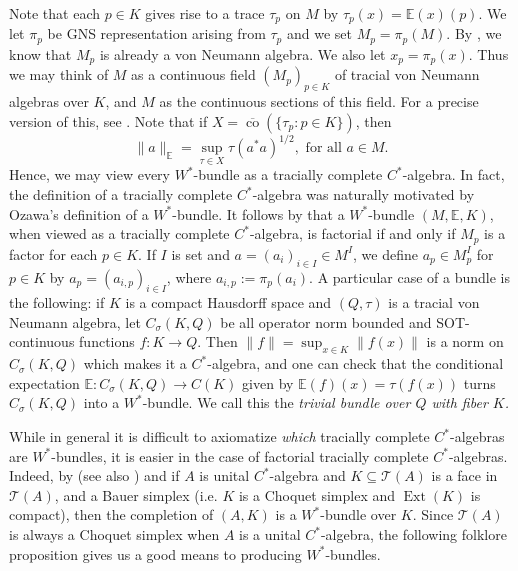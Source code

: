 \documentclass[10pt]{amsart}
\theoremstyle{definition}
\numberwithin{equation}{section}
\newcommand{\bE}{{\mathbb E}}
\newcommand{\cT}{{\mathcal T}}
\DeclareMathOperator{\Ext}{Ext}
\DeclareMathOperator{\co}{co}
\begin{document}
Note that each $p\in K$ gives rise to a trace $\tau_{p}$ on $M$ by $\tau_{p}(x)=\bE(x)(p)$. We let $\pi_{p}$ be GNS representation arising from $\tau_{p}$ and we set $M_{p}=\pi_{p}(M)$. By \cite[Theorem 11]{OzawaBundle}, we know that $M_{p}$ is already a von Neumann algebra. We also let $x_{p}=\pi_{p}(x)$. Thus we may think of $M$ as a continuous field $(M_{p})_{p\in K}$ of tracial von Neumann algebras over $K$, and $M$ as the continuous sections of this field. For a precise version of this, see \cite{EPBundles}.
Note that if $X=\overline{\co}(\{\tau_{p}:p\in K\})$, then 
\[\|a\|_{\bE}=\sup_{\tau\in X}\tau(a^{*}a)^{1/2}, \text{ for all $a\in M$.}\]
Hence, we may view every $W^{*}$-bundle as a tracially complete $C^{*}$-algebra. In fact, the definition of a tracially complete $C^{*}$-algebra was naturally motivated by Ozawa's definition of a $W^{*}$-bundle. 
It follows by \cite[Proposition 3.6]{TraciallyComplete} that a $W^{*}$-bundle $(M,\bE,K)$, when viewed as a tracially complete $C^{*}$-algebra, is factorial if and only if $M_{p}$ is a factor for each $p\in K$. If $I$ is set and $a=(a_{i})_{i\in I}\in M^{I}$, we define $a_{p}\in M_{p}^{I}$ for $p\in K$ by $a_{p}=(a_{i,p})_{i\in I}$, where $a_{i,p}:=\pi_{p}(a_{i})$.
A particular case of a bundle is the following: if $K$ is a compact Hausdorff space and $(Q,\tau)$ is a tracial von Neumann algebra, let $C_{\sigma}(K,Q)$ be all operator norm bounded and SOT-continuous functions $f\colon K\to Q$. 
Then $\|f\|=\sup_{x\in K}\|f(x)\|$ is a norm on $C_{\sigma}(K,Q)$ which makes it a $C^{*}$-algebra, and one can check that the conditional expectation $\bE\colon C_{\sigma}(K,Q)\to C(K)$ given by $\bE(f)(x)=\tau(f(x))$ turns $C_{\sigma}(K,Q)$ into a $W^{*}$-bundle. We call this the \emph{trivial bundle over $Q$ with fiber $K$.}


While in general it is difficult to axiomatize \emph{which} tracially complete $C^{*}$-algebras are $W^{*}$-bundles, it is easier in the case of factorial tracially complete $C^{*}$-algebras. Indeed, by \cite[Theorem 3]{OzawaBundle} (see also \cite[Theorem 3.37]{TraciallyComplete}) and \cite[Proposition 3.23 (ii) and (iv)]{TraciallyComplete} if $A$ is  unital $C^{*}$-algebra and $K\subseteq\cT(A)$ is a face in $\cT(A)$, and a Bauer simplex (i.e. $K$ is a Choquet simplex and $\Ext(K)$ is compact), then the completion of $(A,K)$ is a $W^{*}$-bundle over $K$. Since $\cT(A)$ is always a Choquet simplex when $A$ is a unital $C^{*}$-algebra, the following folklore proposition gives us a good means to producing $W^{*}$-bundles. 
\end{document}
